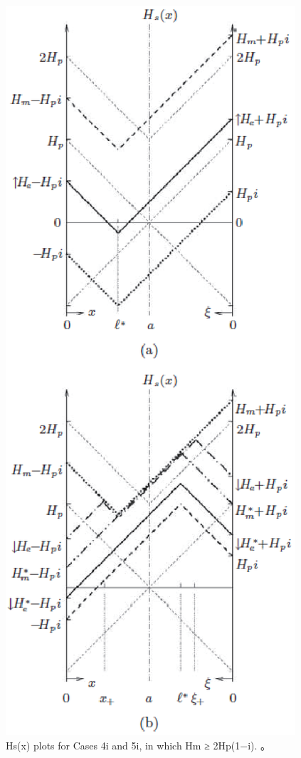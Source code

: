 \begin{figure}[htbp]
	\centering
	\includegraphics[scale=0.7]{chpt7/figs/fig7.16.eps}
	\caption{Hs(x) plots for Cases 4i and
		5i, in which Hm ≥ 2Hp(1−i). 。}
\end{figure}



